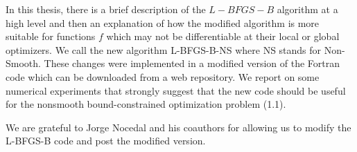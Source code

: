 In this thesis, there is a brief description of the $L-BFGS-B$ algorithm
at a high level and then an explanation of how the modified algorithm
is more suitable for functions $f$ which may not be
differentiable at their local or global optimizers.  
We call the new algorithm L-BFGS-B-NS where NS stands for
Non-Smooth.  These changes were implemented in a modified version 
of the Fortran code \citep{lbfgsbNS} which can be downloaded from a web repository.  We report on some numerical experiments 
that strongly suggest that the new code should be useful for the
nonsmooth bound-constrained optimization problem (1.1).

We are grateful to Jorge Nocedal and his coauthors for allowing us 
to modify the L-BFGS-B code and post the modified version.  





